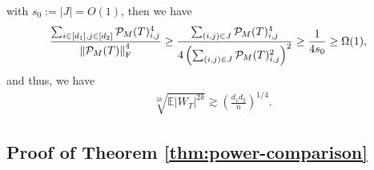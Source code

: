 \documentclass[12pt]{article}
\newcommand{\tF}{{\rm F}}
\newcommand{\abs}[1]{\left\lvert#1\right\rvert}
\newcommand{\norm}[1]{\left\lVert#1\right\rVert}
\newcommand{\E}{\mathbb{E}}
\newcommand{\cP}{\mathcal{P}}
\theoremstyle{plain}
\begin{document}
with  $s_0:=\abs{J}=O(1)$, then we have 
\begin{equation*}
	\begin{aligned}
		\frac{\sum_{i\in [d_1],j\in[d_2]} \cP_M(T)_{i,j}^4}{\norm{\cP_M(T) }^4_\tF } \ge \frac{\sum_{(i,j)\in J} \cP_M(T)_{i,j}^4}{  4 \left( \sum_{(i,j)\in J} \cP_M(T)_{i,j}^2 \right)^2 } \ge \frac{1}{4 s_0} \ge \Omega(1),
	\end{aligned}
\end{equation*}
and thus, we have
\begin{equation*}
	\begin{aligned}
		&\sqrt[2k]{\E \abs{W_{T} }^{2k}} \gtrsim \left( \frac{d_1 d_2}{n}\right)^{1/4}. 
	\end{aligned}
\end{equation*}

\subsection{Proof of Theorem \ref{thm:power-comparison}}
\end{document}
